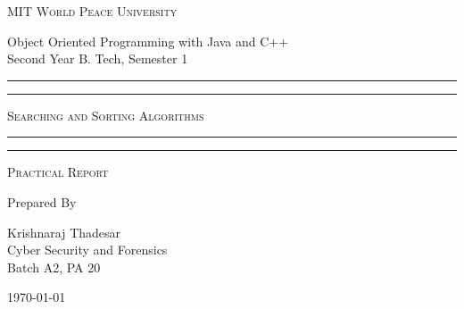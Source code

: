 \documentclass[11pt]{article}
\begin{document}
\begin{titlepage}
	\centering


	\huge\textsc{
		MIT World Peace University
	}\\

	\vspace{0.75\baselineskip} %

	\LARGE{
		Object Oriented Programming with Java and C++\\
		Second Year B. Tech, Semester 1
	}

	\vfill %


	\rule{\textwidth}{1.6pt}\vspace*{-\baselineskip}\vspace*{2pt}
	\rule{\textwidth}{0.6pt}
	\vspace{0.75\baselineskip} %



	\huge{\textsc{
			Searching and Sorting Algorithms
		}} \\



	\vspace{0.5\baselineskip} %
	\rule{\textwidth}{0.6pt}\vspace*{-\baselineskip}\vspace*{2.8pt}
	\rule{\textwidth}{1.6pt}

	\vspace{1\baselineskip} %


	\LARGE\textsc{
		Practical Report
	} %
	\vfill


	Prepared By
	\vspace{0.5\baselineskip} %

	\Large{
		Krishnaraj Thadesar \\
		Cyber Security and Forensics\\
		Batch A2, PA 20
	}


	\vspace{0.5\baselineskip} %
	\today

\end{titlepage}
\end{document}
